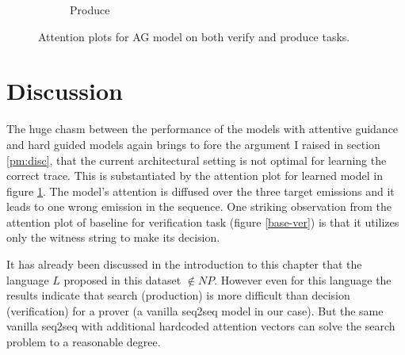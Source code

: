 \begin{figure}[H]
\begin{subfigure}[b]{0.5\linewidth}
		\caption{Produce} 
		\label{learn-prod} 
		\vspace{2ex}
	\end{subfigure}
	\caption{Attention plots for AG model on both verify and produce tasks. }
	\label{learn-attn}
\end{figure}

\section{Discussion}\label{mt:disc}
The huge chasm between the performance of the models with attentive guidance and hard guided models again brings to fore the argument I raised in section \ref{pm:disc}, that the current architectural setting is not optimal for learning the correct trace. This is substantiated by the attention plot for learned model in figure \ref{learn-prod}. The model's attention is diffused over the three target emissions and it leads to one wrong emission in the sequence. One striking observation from the attention plot of baseline for verification task (figure \ref{base-ver}) is that it utilizes only the witness string to make its decision.

It has already been discussed in the introduction to this chapter that the language $L$ proposed in this dataset $\notin NP$. However even for this language the results indicate that search (production) is more difficult than decision (verification) for a prover (a vanilla seq2seq model in our case). But the same vanilla seq2seq with additional hardcoded attention vectors can solve the search problem to a reasonable degree.